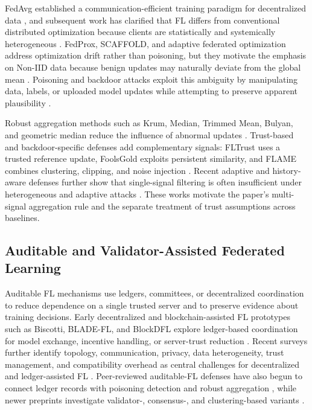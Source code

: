 \documentclass[preprint,12pt]{elsarticle}
\begin{document}
FedAvg established a communication-efficient training paradigm for decentralized data \citep{mcmahan2017fedavg}, and subsequent work has clarified that FL differs from conventional distributed optimization because clients are statistically and systemically heterogeneous \citep{kairouz2021advances}. FedProx, SCAFFOLD, and adaptive federated optimization address optimization drift rather than poisoning, but they motivate the emphasis on Non-IID data because benign updates may naturally deviate from the global mean \citep{li2020fedprox,karimireddy2020scaffold,reddi2021fedopt}. Poisoning and backdoor attacks exploit this ambiguity by manipulating data, labels, or uploaded model updates while attempting to preserve apparent plausibility \citep{fang2020local,bagdasaryan2020backdoor,baruch2019little,xie2020dba,nguyen2022flame}.

Robust aggregation methods such as Krum, Median, Trimmed Mean, Bulyan, and geometric median reduce the influence of abnormal updates \citep{blanchard2017krum,yin2018byzantine,elmhamdi2018bulyan,pillutla2022rfa}. Trust-based and backdoor-specific defenses add complementary signals: FLTrust uses a trusted reference update, FoolsGold exploits persistent similarity, and FLAME combines clustering, clipping, and noise injection \citep{cao2021fltrust,fung2020foolsgold,nguyen2022flame}. Recent adaptive and history-aware defenses further show that single-signal filtering is often insufficient under heterogeneous and adaptive attacks \citep{wang2025adaaggrl,wang2025fedhan}. These works motivate the paper's multi-signal aggregation rule and the separate treatment of trust assumptions across baselines.

\subsection{Auditable and Validator-Assisted Federated Learning}

Auditable FL mechanisms use ledgers, committees, or decentralized coordination to reduce dependence on a single trusted server and to preserve evidence about training decisions. Early decentralized and blockchain-assisted FL prototypes such as Biscotti, BLADE-FL, and BlockDFL explore ledger-based coordination for model exchange, incentive handling, or server-trust reduction \citep{shayan2018biscotti,li2021bladefl,qin2022blockdfl}. Recent surveys further identify topology, communication, privacy, data heterogeneity, trust management, and compatibility overhead as central challenges for decentralized and ledger-assisted FL \citep{yuan2024dflsurvey,jiang2023blockflsurvey,hallaji2024dflsecurity}. Peer-reviewed auditable-FL defenses have also begun to connect ledger records with poisoning detection and robust aggregation \citep{dong2024blockchain,zhang2024bitfl,ren2024bpfl}, while newer preprints investigate validator-, consensus-, and clustering-based variants \citep{garcia2025kfc,carney2025fidelis,bouchiha2026abc}.
\end{document}
